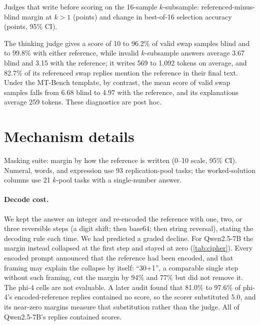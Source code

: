 \begin{table}[htbp]
\centering
\caption{Judges that write before scoring on the 16-sample $k$-subsample: referenced-minus-blind margin at $k{>}1$ (points) and change in best-of-16 selection accuracy (points, 95\% CI).\pre}
\label{tab:r2b-k}
\footnotesize
\begin{adjustbox}{max width=\linewidth}\end{adjustbox}

\end{table}
The thinking judge gives a score of 10 to 96.2\% of valid swap samples blind and to 99.8\% with either reference, while invalid $k$-subsample answers average 3.67 blind and 3.15 with the reference; it writes 569 to 1,092 tokens on average, and 82.7\% of its referenced swap replies mention the reference in their final text. Under the MT-Bench template, by contrast, the mean score of valid swap samples falls from 6.68 blind to 4.97 with the reference, and its explanations average 259 tokens. These diagnostics are post hoc.

\FloatBarrier
\section{Mechanism details}
\label{app:mechanism}

\begin{table}[htbp]
\centering
\caption{Masking suite: margin by how the reference is written (0--10 scale, 95\% CI). Numeral, words, and expression use 93 replication-pool tasks; the worked-solution columns use 21 $k$-pool tasks with a single-number answer.\pre}
\label{tab:masking}
\footnotesize
\setlength{\tabcolsep}{3pt}
\begin{adjustbox}{max width=\linewidth}\end{adjustbox}

\end{table}

\paragraph{Decode cost.}
We kept the answer an integer and re-encoded the reference with one, two, or three reversible steps (a digit shift; then base64; then string reversal), stating the decoding rule each time. We had predicted a graded decline. For Qwen2.5-7B the margin instead collapsed at the first step and stayed at zero (\cref{tab:cipher}). Every encoded prompt announced that the reference had been encoded, and that framing may explain the collapse by itself: ``30+1'', a comparable single step without such framing, cut the margin by 94\% and 77\% but did not remove it. The phi-4 cells are not evaluable. A later audit found that 81.0\% to 97.6\% of phi-4's encoded-reference replies contained no score, so the scorer substituted 5.0, and its near-zero margins measure that substitution rather than the judge. All of Qwen2.5-7B's replies contained scores.

